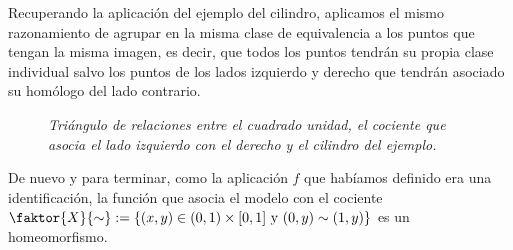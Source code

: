 \begin{ej}
\begin{itemize}
	Recuperando la aplicación del ejemplo del cilindro, aplicamos el mismo razonamiento de agrupar en la misma clase de equivalencia a los puntos que tengan la misma imagen, es decir, que todos los puntos tendrán su propia clase individual salvo los puntos de los lados izquierdo y derecho que tendrán asociado su homólogo del lado contrario.
	\begin{figure}[H]
        \centering
        \caption{\textit{Triángulo de relaciones entre el cuadrado unidad, el cociente que asocia el lado izquierdo con el derecho y el cilindro del ejemplo.}}
    \end{figure}
    De nuevo y para terminar, como la aplicación $f$ que habíamos definido era una identificación, la función que asocia el modelo con el cociente $\faktor{X}{\sim} := \{(x,y) \in (0,1) \times [0,1] \mbox{ y } (0,y) \sim (1,y)\}$ es un homeomorfismo.	
	

\end{itemize}
\end{ej}
